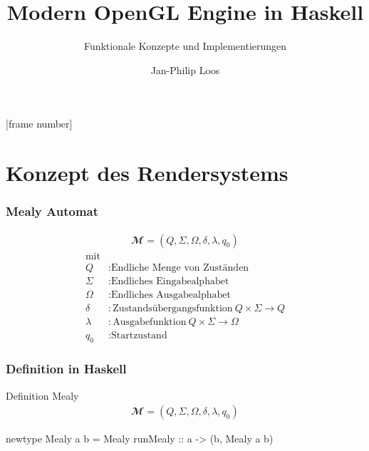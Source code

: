 
[frame number]



\title[Haskell Engine]{Modern OpenGL Engine in Haskell}
\subtitle[Konzepte]{Funktionale Konzepte und Implementierungen}
\author{Jan-Philip Loos}
\date{\protect{}}
\maketitle
{}


\section{Konzept des Rendersystems}
\begin{frame}
  \frametitle{Mealy Automat}
  \begin{Definition}
    \begin{align}
    \mathbfcal{M} = \left( Q, \Sigma, \Omega, \delta, \lambda, q_0 \right)
    \label{def:mealy-formal}
    \end{align}
    \begin{align*}
    	\text{mit}\\
    	Q &: \text{Endliche Menge von Zuständen} \\
    	\Sigma  &:\text{Endliches Eingabealphabet} \\
    	\Omega  &:\text{Endliches Ausgabealphabet} \\
    	\delta  &:\text{Zustandsübergangsfunktion}\ Q \times \Sigma \rightarrow Q \\
    	\lambda &:\text{Ausgabefunktion}\ Q \times \Sigma \rightarrow \Omega \\
    	q_0 &: \text{Startzustand}
    \end{align*}
  \end{Definition}
\end{frame}

\begin{frame}[fragile]
  \frametitle{Definition in Haskell}
  \begin{block}{Definition Mealy}
    \begin{align*}
    \mathbfcal{M} = \left( Q, \Sigma, \Omega, \delta, \lambda, q_0 \right)
    \label{def:mealy-formal}
  \end{align*}
  \end{block}
  \begin{haskell}[label={lst:haskell-mealy},caption={[Definition Mealy in Haskell]Definition Mealy in Haskell\protect\footnotemark}]
newtype Mealy a b = Mealy {
  runMealy :: a -> (b, Mealy a b)
}
  \end{haskell}
\end{frame}

